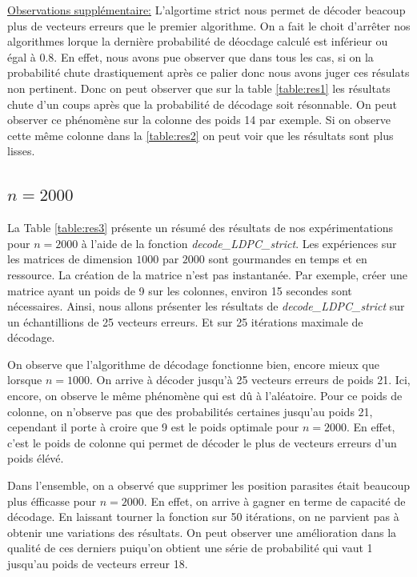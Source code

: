 \documentclass[french,nochapter,11pt]{rapportUB}
\begin{document}
\underline{Observations supplémentaire:} L'algortime strict nous permet de décoder beacoup plus de vecteurs erreurs que le premier algorithme. On a fait le choit d'arrêter nos algorithmes
lorque la dernière probabilité de déocdage calculé est inférieur ou égal à 0.8. En effet, nous avons pue observer que dans tous les cas, si on la probabilité chute drastiquement
après ce palier donc nous avons juger ces résulats non pertinent. Donc on peut observer que sur la table \ref{table:res1} les résultats chute d'un coups après que la probabilité de décodage soit 
résonnable. On peut observer ce phénomène sur la colonne des poids 14 par exemple. Si on observe cette même colonne dans la \ref{table:res2} on peut voir que les résultats sont plus lisses.

\subsection{$n = 2000$}
La Table \ref{table:res3} présente un résumé des résultats de nos expérimentations pour $n=2000$ à l'aide de la fonction
\textit{decode\_LDPC\_strict}.\vspace{0.4cm}\newline
Les expériences sur les matrices de dimension $1000$ par $2000$ sont gourmandes en temps et en ressource. La création de la matrice n'est pas instantanée. Par exemple, créer une matrice ayant un poids de 9 sur les colonnes, environ 15 secondes sont nécessaires. 
Ainsi, nous allons présenter 
les résultats de \textit{decode\_LDPC\_strict} sur un échantillions de 25 vecteurs erreurs. Et sur 25 itérations maximale de décodage.\vspace{0.4cm}\newline

On observe que l'algorithme de décodage fonctionne bien, encore mieux que lorsque $n=1000$. On arrive à décoder jusqu'à 25 vecteurs erreurs de poids 21. Ici, encore, on observe le même phénomène qui est 
dû à l'aléatoire. Pour ce poids de colonne, on n'observe pas que des probabilités certaines jusqu'au poids 21, cependant il porte à croire que 9 est le poids optimale pour 
$n = 2000$. En effet, c'est le poids de colonne qui permet de décoder le plus de vecteurs erreurs d'un poids élévé.\vspace{0.4cm}\newline

Dans l'ensemble, on a observé que supprimer les position parasites était beaucoup plus éfficasse pour $n=2000$. En effet, on arrive à gagner en terme de capacité de décodage.
En laissant tourner la fonction sur 50 itérations, on ne parvient pas à obtenir une variations des résultats. On peut observer une amélioration dans la qualité de ces derniers puiqu'on obtient
une série de probabilité qui vaut 1 jusqu'au poids de vecteurs erreur 18.
\end{document}
